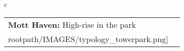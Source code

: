 \begin{table}[H]
        \begin{tabular}{c}
        \begin{tabular}{m{1.5in} m{2in}}
\textbf{Mott Haven:} {High-rise in the park} & \texttt{[image: \\rootpath/IMAGES/typology\_towerpark.png]}
\end{tabular}\end{tabular}
        \end{table}